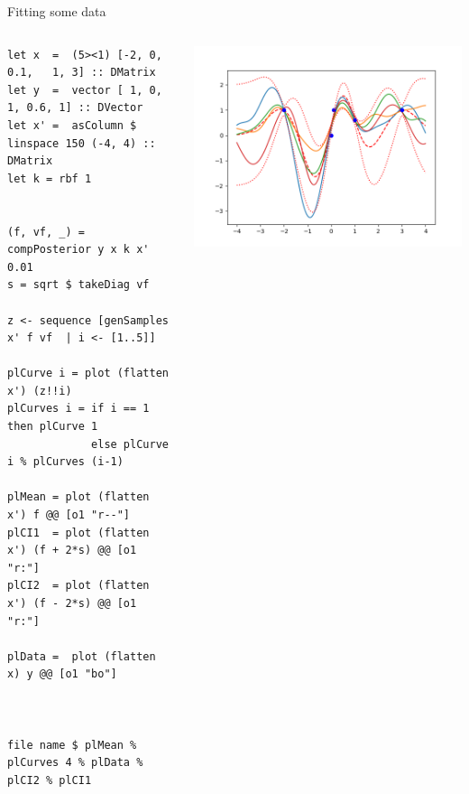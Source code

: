 \documentclass[presentation]{beamer}
\begin{document}
\begin{frame}[fragile,label={sec:org4838cd5}]{Fitting some data}
 \begin{columns}
\begin{column}{0.37\columnwidth}
\begin{verbatim}
let x  =  (5><1) [-2, 0, 0.1,   1, 3] :: DMatrix
let y  =  vector [ 1, 0,   1, 0.6, 1] :: DVector
let x' =  asColumn $ linspace 150 (-4, 4) :: DMatrix
let k = rbf 1


(f, vf, _) = compPosterior y x k x' 0.01
s = sqrt $ takeDiag vf

z <- sequence [genSamples x' f vf  | i <- [1..5]]

plCurve i = plot (flatten x') (z!!i)
plCurves i = if i == 1 then plCurve 1 
             else plCurve i % plCurves (i-1)

plMean = plot (flatten x') f @@ [o1 "r--"] 
plCI1  = plot (flatten x') (f + 2*s) @@ [o1 "r:"] 
plCI2  = plot (flatten x') (f - 2*s) @@ [o1 "r:"] 

plData =  plot (flatten x) y @@ [o1 "bo"]



file name $ plMean % plCurves 4 % plData % plCI2 % plCI1
\end{verbatim}
\end{column}


\begin{column}{0.55\columnwidth}
\begin{center}
\includegraphics[width=.9\linewidth]{images/fig10.png}
\end{center}
\end{column}
\end{columns}
\end{frame}
\end{document}
